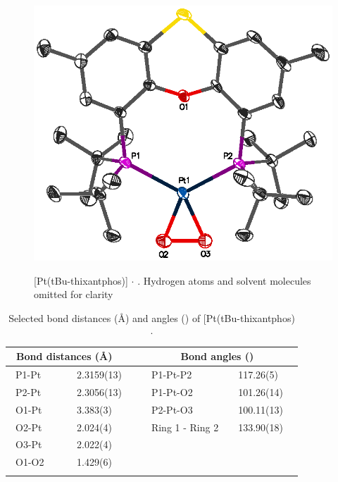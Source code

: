 \begin{figure}[ht]
\begin{center}
\vspace{0.5cm}
\includegraphics{../Figures/Crystalplatinumdioxygen.eps}
\caption[X-ray crystal structure of [Pt(tBu-thixantphos)\ce{O2}{]} $\cdot{}$ ]{[Pt(tBu-thixantphos)] $\cdot{}$ .  Hydrogen atoms and solvent molecules omitted for clarity}
\vspace{0.2cm}
\label{crystal:dioxygen}
\end{center}
\end{figure}
\vspace{0.2cm}

\begin{table}[ht]
\caption[Selected bond distances (\AA) and angles (\degrees) of [Pt(tBu-thixantphos)\ce{O2}{]} $\cdot{}$ ]{Selected bond distances (\AA) and angles (\degrees) of [Pt(tBu-thixantphos)\ce{O2}{]} $\cdot{}$ } 
\vspace{1em}
\label{table:crystaldioxygen:lengths}
\small
\begin{center}
\begin{tabular}{l l l l}
	\toprule
	\multicolumn{2}{l}{\bfseries{~Bond distances (\si{\angstrom})}} & \multicolumn{2}{c}{\bfseries{Bond angles (\degrees)}} \\
	\midrule		
	~P1-Pt		~~&~~2.3159(13)~~	&~~P1-Pt-P2			&~~117.26(5)~~	\\	
	~P2-Pt		~~&~~2.3056(13)~~	&~~P1-Pt-O2			&~~101.26(14)~~	\\
	~O1-Pt		~~&~~3.383(3)~~	&~~P2-Pt-O3			&~~100.11(13)~~	\\
	~O2-Pt		~~&~~2.024(4)~~	&~~Ring 1 - Ring 2		&~~133.90(18)~~	\\
	~O3-Pt		~~&~~2.022(4)~~	&~~					&~~		~~		\\
	~O1-O2		~~&~~1.429(6)~~	&~~					&~~		~~		\\
	\bottomrule{}
\end{tabular}
\end{center}
\end{table}

